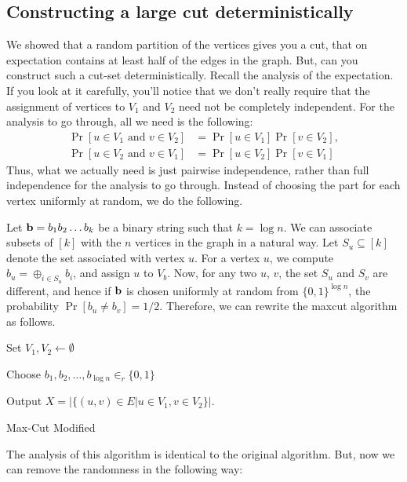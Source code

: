 \subsection{Constructing a large cut deterministically}

We showed that a random partition of the vertices gives you a cut, that on expectation contains at least half of the edges in the graph. But, can you construct such a cut-set deterministically. Recall the analysis of the expectation. If you look at it carefully, you'll notice that we don't really require that the assignment of vertices to $V_1$ and $V_2$ need not be completely independent. For the analysis to go through, all we need is the following:
\begin{align*}
	\Pr[u \in V_1 \text{ and } v\in V_2] &= \Pr[u \in V_1] \Pr[v \in V_2], \\
	\Pr[u \in V_2 \text{ and } v\in V_1] &= \Pr[u \in V_2] \Pr[v \in V_1]
\end{align*}
Thus, what we actually need is just pairwise independence, rather than full independence for the analysis to go through. Instead of choosing the part for each vertex uniformly at random, we do the following.

Let $\mathbf{b} = b_1b_2\ldots b_k$ be a binary string such that $k=\log n$. We can associate subsets of $[k]$ with the $n$ vertices in the graph in a natural way. Let $S_u \subseteq [k]$ denote the set associated with vertex $u$. For a vertex $u$, we compute $b_u = \oplus_{i\in S_u} b_i$, and assign $u$ to $V_b$. Now, for any two $u$, $v$, the set $S_u$ and $S_v$ are different, and hence if $\mathbf{b}$ is chosen uniformly at random from $\{0,1\}^{\log n}$, the probability $\Pr[b_u \neq b_v] = 1/2$. Therefore, we can rewrite the maxcut algorithm as follows.

\begin{algorithm}
	
	Set $V_1, V_2 \gets \emptyset$
	
	Choose $b_1, b_2, \ldots, b_{\log n} \in_r \{0,1\}$
		
	
	Output $X = |\{(u,v)\in E | u\in V_1, v\in V_2 \}|$.
	\caption{Max-Cut Modified}
	\label{alg:maxcut-modified}
\end{algorithm}

The analysis of this algorithm is identical to the original algorithm. But, now we can remove the randomness in the following way:

